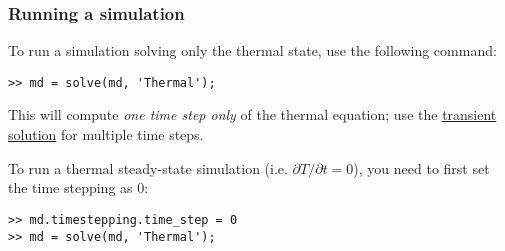 \subsubsection{Running a simulation}
To run a simulation solving only the thermal state, use the following command:
\begin{lstlisting}
>> md = solve(md, 'Thermal');
\end{lstlisting}
This will compute \emph{one time step only} of the thermal equation; use the 
\hyperref[sec:using-issm-capabilities-transient]{transient solution}
for multiple time steps.

To run a thermal steady-state simulation  (i.e. $\partial T/\partial t = 0$), you need to first set the time stepping as 0:
\begin{lstlisting}
>> md.timestepping.time_step = 0
>> md = solve(md, 'Thermal');
\end{lstlisting}

\clearpage %
